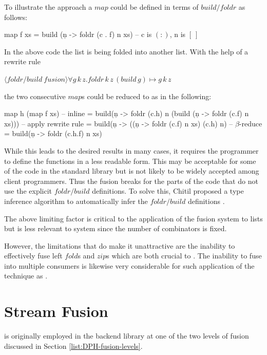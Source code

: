 \documentclass[preamble.tex]{subfiles}
\begin{document}
To illustrate the approach a $map$ could be defined in terms of $build/foldr$ as follows:

\begin{hscode}[mathescape]
map f xs = build (\c n -> foldr (c . f) n xs)
-- c is $\mathtt{(:)}$, n is $\mathtt{[\ ]}$
\end{hscode}


In the above code the list is being folded into another list. With the help of a rewrite rule

$\langle \mathit{foldr/build\ fusion} \rangle\forall g\, k\, z.\mathit{foldr}\, k\, z\,(build\, g)\mapsto g\, k\, z$

the two consecutive $map$s could be reduced to as in the following:

\begin{hscode}[mathescape]
map h (map f xs)
 -- inline
 = build(\c n -> foldr (c.h) n 
  (build (\c n -> foldr (c.f) n xs)))
 -- apply rewrite rule
 = build(\c n -> ((\c n -> foldr (c.f) n xs) (c.h) n)
 -- $\beta$-reduce
 = build(\c n -> foldr (c.h.f) n xs)
\end{hscode}


While this leads to the desired results in many cases, it requires the programmer to define the functions in a less readable form. This may be acceptable for some of the code in the standard library but is not likely to be widely accepted among client programmers. Thus the fusion breaks for the parts of the code that do not use the explicit $foldr/build$ definitions. To solve this, Chitil proposed a type inference algorithm to automatically infer the $foldr/build$ definitions \cite{Chi99}.

The above limiting factor is critical to the application of the fusion system to lists but is less relevant to \LiveFusion system since the number of combinators is fixed.

However, the limitations that do make it unattractive are the inability to effectively fuse left $fold$s and $zip$s which are both crucial to \DPH. The inability to fuse into multiple consumers is likewise very considerable for such application of the technique as \DPH.


\clearpage

\section{Stream Fusion}
\label{sec:Stream-Fusion}
\istreamfusion{}

 \cite{CLS07,CSL06} is originally employed in the \DPH backend library at one of the two levels of fusion discussed in Section \vref{list:DPH-fusion-levels}.
\end{document}
